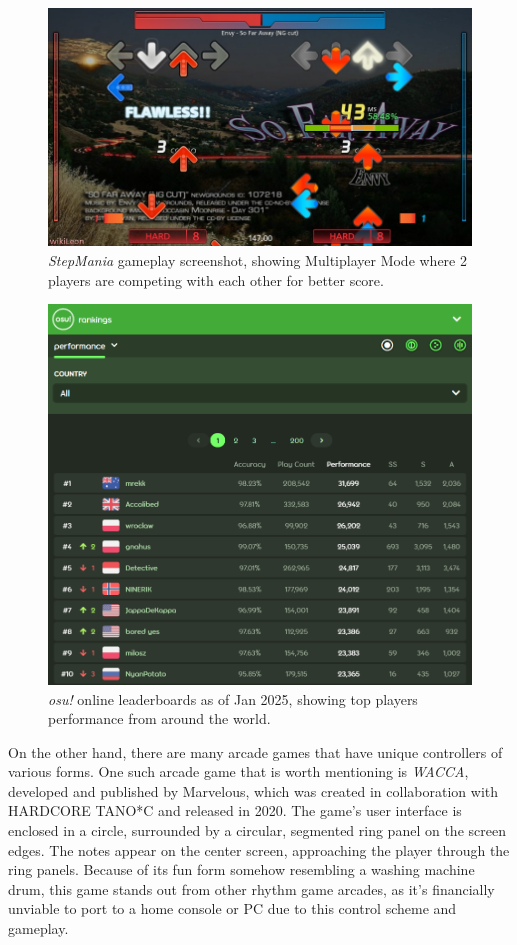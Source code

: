 \begin{figure}[h]
    \centering\includegraphics[scale=0.2]{obrazki/sm5multi.jpg}
    \caption{\textit{StepMania} gameplay screenshot, showing Multiplayer Mode where 2 players are competing with each other for better score. \cite{sm5multi}}
    \label{fig:sm5_multi}
\end{figure}
\pagebreak
\begin{figure}[h]
    \centering\includegraphics[scale=0.155]{obrazki/osuleaderboards.png}
    \caption{\textit{osu!} online leaderboards as of Jan 2025, showing top players performance from around the world. \cite{osuleaderboards}}
    \label{fig:osu_leaderboards}
\end{figure}
 
On the other hand, there are many arcade games that have unique controllers of various forms. 
One such arcade game that is worth mentioning is \textit{WACCA}, developed and published by Marvelous, which was created in collaboration with HARDCORE TANO*C and released in 2020. The game's user interface is enclosed in a circle, surrounded by a circular, segmented ring panel on the screen edges. The notes appear on the center screen, approaching the player through the ring panels. Because of its fun form somehow resembling a washing machine drum, this game stands out from other rhythm game arcades, as it's financially unviable to port to a home console or PC due to this control scheme and gameplay.

